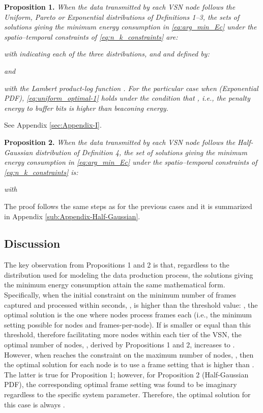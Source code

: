 \documentclass[twocolumn,english]{IEEEtran}
\theoremstyle{plain}
\theoremstyle{definition}
\begin{document}
\textbf{Proposition 1.}\emph{ When the data transmitted by each VSN
node follows the Uniform, Pareto or Exponential distributions of Definitions
1--3, the sets of solutions giving the minimum energy consumption
in \eqref{eq:arg_min_Ec} under the spatio--temporal constraints of
\eqref{eq:n_k_constraints} are:} 

\emph{with }
\emph{indicating each of the three distributions, and }
\emph{and } \emph{defined by:} 







\emph{and}


\emph{with  the Lambert product-log function \cite{corless1996lambertw}.
For the particular case when } \emph{(Exponential
PDF), \eqref{eq:uniform_optimal-1} holds under the condition that
, i.e., the penalty energy to buffer bits is higher than beaconing
energy.} 
\begin{IEEEproof}
See Appendix \ref{sec:Appendix-I}. 
\end{IEEEproof}
\textbf{Proposition 2.}\emph{ When the data transmitted by each VSN
node follows the Half-Gaussian distribution of Definition 4, the set
of solutions giving the minimum energy consumption in \eqref{eq:arg_min_Ec}
under the spatio--temporal constraints of \eqref{eq:n_k_constraints}
is:}


\emph{with} 


\begin{IEEEproof}
The proof follows the same steps as for the previous cases and it
is summarized in Appendix \ref{sub:Appendix-Half-Gaussian}. 
\end{IEEEproof}

\subsection{Discussion}

The key observation from Propositions 1 and 2 is that, regardless
to the distribution used for modeling the data production process,
the solutions giving the minimum energy consumption attain the same
mathematical form. Specifically, when the initial constraint on the
minimum number of frames captured and processed within  seconds,
, is higher than the threshold value: ,
the optimal solution is the one where  nodes process 
frames each (i.e., the minimum setting possible for nodes and frames-per-node).
If  is smaller or equal than this threshold, therefore
facilitating more nodes within each tier of the VSN, the optimal number
of nodes, , derived by Propositions 1 and 2, increases
to . However, when 
reaches the constraint on the maximum number of nodes, ,
then the optimal solution for each node is to use a frame setting
that is higher than . The latter is true for Proposition
1; however, for Proposition 2 (Half-Gaussian PDF), the corresponding
optimal frame setting was found to be imaginary regardless to the
specific system parameter. Therefore, the optimal solution for this
case is always .
\end{document}
